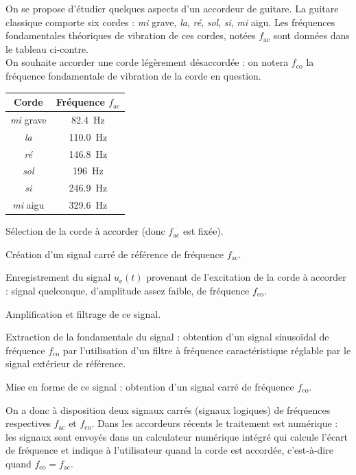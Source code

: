 \documentclass[a4paper,french,bookmarks]{article}
\begin{document}
\newboxans

\begin{minipage}{0.6\linewidth}
	On se propose d'étudier quelques aspects d'un accordeur de guitare.
	La guitare classique comporte six cordes : \textsl{mi} grave, \textsl{la}, \textsl{ré}, \textsl{sol}, \textsl{si}, \textsl{mi} aigu. 
	Les fréquences fondamentales théoriques de vibration de ces cordes, notées
	$f_\text{ac}$ sont données dans le tableau ci-contre.\\[-5pt]
	
	On souhaite accorder une corde légèrement désaccordée : on notera $f_\text{co}$ la fréquence fondamentale de
	vibration de la corde en question.
\end{minipage}
%
\hfill
%
\begin{minipage}{0.35\linewidth}
	\centering
	\begin{tabular}{c|c}
		Corde 				& Fréquence $f_\text{ac}$	\\ \hline\hline
		\textsl{mi} grave 	& \SI{82,4}{\hertz} 		\\
		\textsl{la} 		& \SI{110,0}{\hertz} 		\\
		\textsl{ré} 		& \SI{146,8}{\hertz} 		\\
		\textsl{sol} 		& \SI{196}{\hertz} 			\\
		\textsl{si} 		& \SI{246,9}{\hertz} 		\\
		\textsl{mi} aigu 	& \SI{329,6}{\hertz} 		\\
	\end{tabular}
\end{minipage}

%
\begin{enumerate}
	\itt Sélection de la corde à accorder (donc $f_\text{ac}$ est fixée).
	
	\itt Création d'un signal carré de référence de fréquence $f_\text{ac}$.
	
	\itt Enregistrement du signal $u_\text{e}(t)$ provenant de l'excitation de
	la corde à accorder : signal quelconque, d'amplitude assez faible,
	de fréquence $f_\text{co}$.
	
	\itt Amplification et filtrage de ce signal.
	
	\itt Extraction de la fondamentale du signal : obtention d'un signal
	sinusoïdal de fréquence $f_\text{co}$ par l'utilisation d'un filtre à
	fréquence caractéristique réglable par le signal extérieur de
	référence.
	
	\itt Mise en forme de ce signal : obtention d'un signal carré de
	fréquence $f_\text{co}$.
	
	\itt On a donc à disposition deux signaux carrés (signaux logiques)
	de fréquences respectives $f_\text{ac}$ et $f_\text{co}$. Dans les accordeurs
	récents le traitement est numérique : les signaux sont envoyés dans un
	calculateur numérique intégré qui calcule l'écart de fréquence et
	indique à l'utilisateur quand la corde est accordée, c'est-à-dire
	quand $f_\text{co}=f_\text{ac}$.
\end{enumerate}
\end{document}
